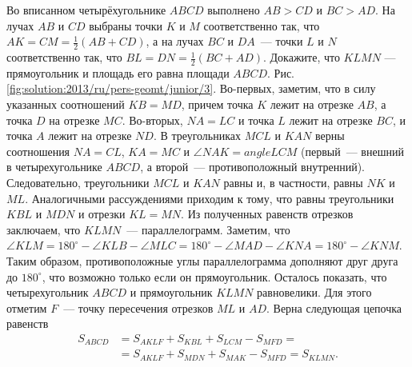 \problem
Во вписанном четырёхугольнике $ABCD$ выполнено $AB > CD$ и $BC > AD$.
На лучах $AB$ и $CD$ выбраны точки $K$ и $M$ соответственно так, что
$AK = CM = \frac{1}{2} (AB + CD)$,
а на лучах $BC$ и $DA$~--- точки $L$ и $N$ соответственно так, что
$BL = DN = \frac{1}{2} (BC + AD)$.
Докажите, что $KLMN$ --- прямоугольник и 
площадь его равна площади $ABCD$.
%
\label{solution:2013/ru/pers-geomt/junior/3}
Рис. \ref{fig:solution:2013/ru/pers-geomt/junior/3}.
Во-первых, заметим, что в силу указанных соотношений $KB = MD$, причем точка
$K$ лежит на отрезке $AB$, а точка $D$ на отрезке $MC$.
Во-вторых, $NA = LC$ и точка $L$ лежит на отрезке $BC$, и точка $A$ лежит на
отрезке $ND$.
В треугольниках $MCL$ и $KAN$ верны соотношения $NA = CL$, $KA = MC$ и
$\angle NAK = angle LCM$ (первый~--- внешний в четырехугольнике $ABCD$, а
второй~--- противоположный внутренний).
Следовательно, треугольники $MCL$ и $KAN$ равны и, в частности, равны $NK$ и
$ML$.
Аналогичными рассуждениями приходим к тому, что равны треугольники $KBL$ и
$MDN$ и отрезки $KL = MN$.
Из полученных равенств отрезков заключаем, что $KLMN$~--- параллелограмм.
Заметим, что
\(
    \angle KLM
=
    180^\circ - \angle KLB - \angle MLC
=
    180^\circ - \angle MAD - \angle KNA
=
    180^\circ - \angle KNM
\).
Таким образом, противоположные углы параллелограмма дополняют друг друга до
$180^\circ$, что возможно только если он прямоугольник.
Осталось показать, что четырехугольник $ABCD$ и прямоугольник $KLMN$
равновелики.
Для этого отметим $F$~--- точку пересечения отрезков $ML$ и $AD$.
Верна следующая цепочка равенств
\begin{align*}
    S_{ABCD}
&{}=
    S_{AKLF} + S_{KBL} + S_{LCM} - S_{MFD}
=\\&{}=
    S_{AKLF} + S_{MDN} + S_{MAK} - S_{MFD}
=
    S_{KLMN}.
\end{align*}
\endproblem
